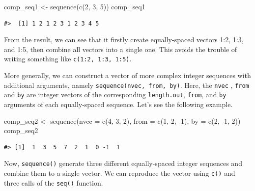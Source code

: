 \documentclass[
]{book}
\newenvironment{Shaded}{\begin{snugshade}}{\end{snugshade}}
\newcommand{\AttributeTok}[1]{\textcolor[rgb]{0.77,0.63,0.00}{#1}}
\newcommand{\DecValTok}[1]{\textcolor[rgb]{0.00,0.00,0.81}{#1}}
\newcommand{\FunctionTok}[1]{\textcolor[rgb]{0.00,0.00,0.00}{#1}}
\newcommand{\NormalTok}[1]{#1}
\newcommand{\OtherTok}[1]{\textcolor[rgb]{0.56,0.35,0.01}{#1}}
\newcommand{\SpecialCharTok}[1]{\textcolor[rgb]{0.00,0.00,0.00}{#1}}
\begin{document}
\begin{Shaded}
\begin{Highlighting}[]
\NormalTok{comp\_seq1 }\OtherTok{\textless{}{-}} \FunctionTok{sequence}\NormalTok{(}\FunctionTok{c}\NormalTok{(}\DecValTok{2}\NormalTok{, }\DecValTok{3}\NormalTok{, }\DecValTok{5}\NormalTok{)) }
\NormalTok{comp\_seq1}
\end{Highlighting}
\end{Shaded}

\begin{verbatim}
#>  [1] 1 2 1 2 3 1 2 3 4 5
\end{verbatim}

From the result, we can see that it firstly create equally-spaced vectors 1:2, 1:3, and 1:5, then combine all vectors into a single one. This avoids the trouble of writing something like \texttt{c(1:2,\ 1:3,\ 1:5)}.

More generally, we can construct a vector of more complex integer sequences with additional arguments, namely \texttt{sequence(nvec,\ from,\ by)}. Here, the \texttt{nvec} , \texttt{from} and \texttt{by} are integer vectors of the corresponding \texttt{length.out}, \texttt{from}, and \texttt{by} arguments of each equally-spaced sequence. Let's see the following example.

\begin{Shaded}
\begin{Highlighting}[]
\NormalTok{comp\_seq2 }\OtherTok{\textless{}{-}} \FunctionTok{sequence}\NormalTok{(}\AttributeTok{nvec =} \FunctionTok{c}\NormalTok{(}\DecValTok{4}\NormalTok{, }\DecValTok{3}\NormalTok{, }\DecValTok{2}\NormalTok{), }\AttributeTok{from =} \FunctionTok{c}\NormalTok{(}\DecValTok{1}\NormalTok{, }\DecValTok{2}\NormalTok{, }\SpecialCharTok{{-}}\DecValTok{1}\NormalTok{), }\AttributeTok{by =} \FunctionTok{c}\NormalTok{(}\DecValTok{2}\NormalTok{, }\SpecialCharTok{{-}}\DecValTok{1}\NormalTok{, }\DecValTok{2}\NormalTok{))}
\NormalTok{comp\_seq2}
\end{Highlighting}
\end{Shaded}

\begin{verbatim}
#> [1]  1  3  5  7  2  1  0 -1  1
\end{verbatim}

Now, \texttt{sequence()} generate three different equally-spaced integer sequences and combine them to a single vector. We can reproduce the vector using \texttt{c()} and three calls of the \texttt{seq()} function.
\end{document}

